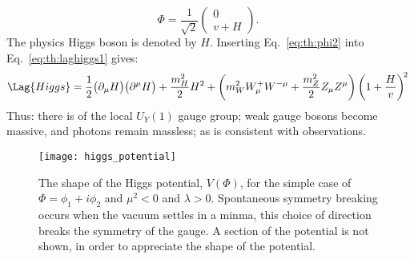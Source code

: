 \begin{equation}
  \Phi = \frac{1}{\sqrt{2}}
  \begin{pmatrix} 0 \\ v+H
  \end{pmatrix}.
  \label{eq:th:phi2}
\end{equation}
The physics Higgs boson is denoted by $H$.
Inserting Eq.~\ref{eq:th:phi2} into Eq.~\ref{eq:th:laghiggs1} gives:
\begin{equation}
  \Lag{Higgs} =
  \frac{1}{2}\big(\partial_\mu H\big)\big(\partial^\mu H\big)
  +\frac{m_H^2}{2}H^2
  +\left(m_W^2W_\mu^+W^{-\mu} + \frac{m_Z^2}{2}Z_\mu Z^\mu\right)
  \left(1 + \frac{H}{v}\right)^{\!2}
  \label{eq:th:laghiggs2}
\end{equation}
Thus: there is \SSB of the local $U_Y(1)$ gauge group; weak gauge
bosons become massive, and photons remain massless; as is consistent with observations.

\begin{figure}
  \begin{center}
    \texttt{[image: higgs\_potential]}
    \caption[Shape of the Higgs potential]
    {\small
      The shape of the Higgs potential, $V(\Phi)$, for the simple case of $\Phi=\phi_1+i\phi_2$ and
      $\mu^2<0$ and $\lambda>0$.
      Spontaneous symmetry breaking occurs when the vacuum settles in a minma, this choice of
      direction breaks the symmetry of the gauge.
      A section of the potential is not shown, in order to appreciate the shape of the potential.
    }
    \label{fig:th:higgspot}
  \end{center}
\end{figure}

